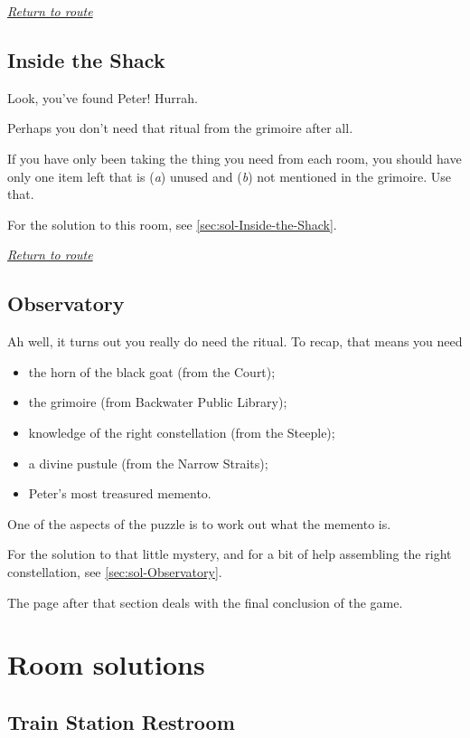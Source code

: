 \documentclass[a5paper]{extarticle}
\begin{document}
\hyperref[sec:route-13]{\emph{Return to route}}

\newpage
\subsection{Inside the Shack}\label{sec:req-Inside-the-Shack}

Look, you've found Peter! Hurrah.

Perhaps you don't need that ritual from the grimoire after all.

If you have only been taking the thing you need from each room,
you should have only one item left that is (\emph{a}) unused and
(\emph{b}) not mentioned in the grimoire. Use that.

For the solution to this room, see \cref{sec:sol-Inside-the-Shack}.

\hyperref[sec:route-13]{\emph{Return to route}}

\newpage
\subsection{Observatory}\label{sec:req-Observatory}

Ah well, it turns out you really do need the ritual.
To recap, that means you need

\begin{itemize}
\item the horn of the black goat (from the Court);
\item the grimoire (from Backwater Public Library);
\item knowledge of the right constellation (from the Steeple);
\item a divine pustule (from the Narrow Straits);
\item Peter's most treasured memento.
\end{itemize}

One of the aspects of the puzzle is to work out what the memento is.

For the solution to that little mystery,
and for a bit of help assembling the right constellation,
see \cref{sec:sol-Observatory}.

The page after that section deals with the final conclusion of the game.

\newpage
\section{Room solutions}\label{sec:sol}

\subsection{Train Station Restroom}\label{sec:sol-Train-Station-Restroom}
\end{document}

